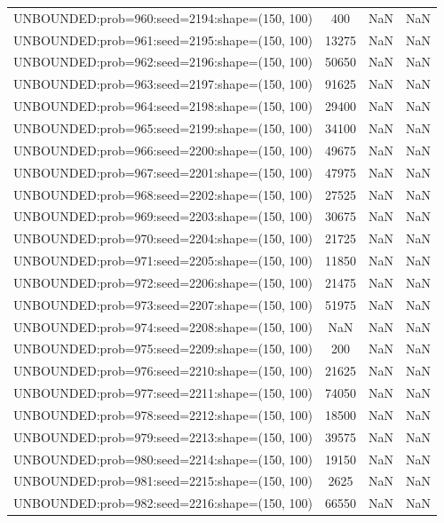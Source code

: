 \begin{longtable}{lccc}
UNBOUNDED:prob=960:seed=2194:shape=(150, 100) &   400 &   NaN &    NaN \\
UNBOUNDED:prob=961:seed=2195:shape=(150, 100) & 13275 &   NaN &    NaN \\
UNBOUNDED:prob=962:seed=2196:shape=(150, 100) & 50650 &   NaN &    NaN \\
UNBOUNDED:prob=963:seed=2197:shape=(150, 100) & 91625 &   NaN &    NaN \\
UNBOUNDED:prob=964:seed=2198:shape=(150, 100) & 29400 &   NaN &    NaN \\
UNBOUNDED:prob=965:seed=2199:shape=(150, 100) & 34100 &   NaN &    NaN \\
UNBOUNDED:prob=966:seed=2200:shape=(150, 100) & 49675 &   NaN &    NaN \\
UNBOUNDED:prob=967:seed=2201:shape=(150, 100) & 47975 &   NaN &    NaN \\
UNBOUNDED:prob=968:seed=2202:shape=(150, 100) & 27525 &   NaN &    NaN \\
UNBOUNDED:prob=969:seed=2203:shape=(150, 100) & 30675 &   NaN &    NaN \\
UNBOUNDED:prob=970:seed=2204:shape=(150, 100) & 21725 &   NaN &    NaN \\
UNBOUNDED:prob=971:seed=2205:shape=(150, 100) & 11850 &   NaN &    NaN \\
UNBOUNDED:prob=972:seed=2206:shape=(150, 100) & 21475 &   NaN &    NaN \\
UNBOUNDED:prob=973:seed=2207:shape=(150, 100) & 51975 &   NaN &    NaN \\
UNBOUNDED:prob=974:seed=2208:shape=(150, 100) &   NaN &   NaN &    NaN \\
UNBOUNDED:prob=975:seed=2209:shape=(150, 100) &   200 &   NaN &    NaN \\
UNBOUNDED:prob=976:seed=2210:shape=(150, 100) & 21625 &   NaN &    NaN \\
UNBOUNDED:prob=977:seed=2211:shape=(150, 100) & 74050 &   NaN &    NaN \\
UNBOUNDED:prob=978:seed=2212:shape=(150, 100) & 18500 &   NaN &    NaN \\
UNBOUNDED:prob=979:seed=2213:shape=(150, 100) & 39575 &   NaN &    NaN \\
UNBOUNDED:prob=980:seed=2214:shape=(150, 100) & 19150 &   NaN &    NaN \\
UNBOUNDED:prob=981:seed=2215:shape=(150, 100) &  2625 &   NaN &    NaN \\
UNBOUNDED:prob=982:seed=2216:shape=(150, 100) & 66550 &   NaN &    NaN \\

\end{longtable}
